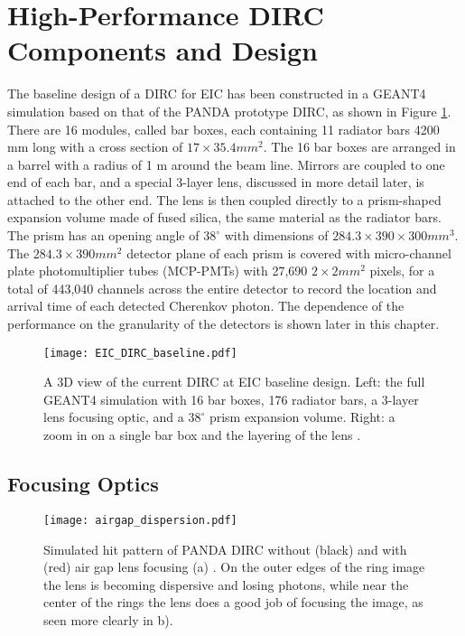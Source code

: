\section{High-Performance DIRC Components and Design}
The baseline design of a DIRC for EIC has been constructed in a GEANT4 simulation based on that of the PANDA prototype DIRC, as shown in Figure \ref{fig:baseline_design}. There are 16 modules, called bar boxes, each containing 11 radiator bars 4200 mm long with a cross section of $17\times35.4\unit{mm}^2$. The 16 bar boxes are arranged in a barrel with a radius of 1 m around the beam line. Mirrors are coupled to one end of each bar, and a special 3-layer lens, discussed in more detail later, is attached to the other end. The lens is then coupled directly to a prism-shaped expansion volume made of fused silica, the same material as the radiator bars. The prism has an opening angle of $38^\circ$ with dimensions of $284.3\times390\times300\unit{mm}^3$. The $284.3\times390\unit{mm}^2$ detector plane of each prism is covered with micro-channel plate photomultiplier tubes (MCP-PMTs) with 27,690 $2\times2\unit{mm}^2$ pixels, for a total of 443,040 channels across the entire detector to record the location and arrival time of each detected Cherenkov photon. The dependence of the performance on the granularity of the detectors is shown later in this chapter.

\begin{figure}[!htb]
	\centering
	\texttt{[image: EIC\_DIRC\_baseline.pdf]}
	\caption[A 3D view of the current DIRC at EIC baseline design.]{A 3D view of the current DIRC at EIC baseline design. Left: the full GEANT4 simulation with 16 bar boxes, 176 radiator bars, a 3-layer lens focusing optic, and a $38^\circ$ prism expansion volume. Right: a zoom in on a single bar box and the layering of the lens \cite{GregDIRC2015}.}
	\label{fig:baseline_design}
\end{figure}

\subsection{Focusing Optics}

\begin{figure}[!htb]
	\centering
	\texttt{[image: airgap\_dispersion.pdf]}
	\caption[Simulated hit pattern of PANDA DIRC without (black) and with (red) air gap lens focusing (a).]{Simulated hit pattern of PANDA DIRC without (black) and with (red) air gap lens focusing (a) \cite{GregThesis}. On the outer edges of the ring image the lens is becoming dispersive  and losing photons, while near the center of the rings the lens does a good job of focusing the image, as seen more clearly in b).}
	\label{fig:airgap_dispersion}
\end{figure}


